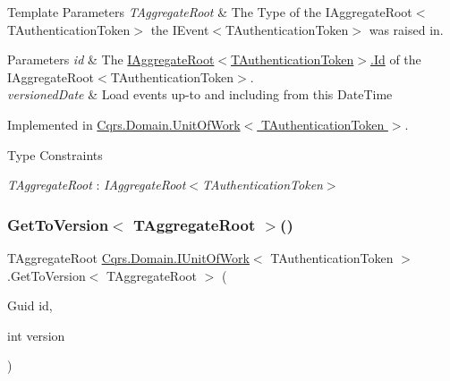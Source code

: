\begin{DoxyTemplParams}{Template Parameters}
{\em T\+Aggregate\+Root} & The Type of the I\+Aggregate\+Root$<$\+T\+Authentication\+Token$>$ the I\+Event$<$\+T\+Authentication\+Token$>$ was raised in.\\
\hline
\end{DoxyTemplParams}

\begin{DoxyParams}{Parameters}
{\em id} & The \hyperlink{interfaceCqrs_1_1Domain_1_1IAggregateRoot_a04aa3198f1371afa345a58e8fcb713d7_a04aa3198f1371afa345a58e8fcb713d7}{I\+Aggregate\+Root$<$\+T\+Authentication\+Token$>$.\+Id} of the I\+Aggregate\+Root$<$\+T\+Authentication\+Token$>$.\\
\hline
{\em versioned\+Date} & Load events up-\/to and including from this Date\+Time\\
\hline
\end{DoxyParams}


Implemented in \hyperlink{classCqrs_1_1Domain_1_1UnitOfWork_ac5f0efae335bee99f820d1c53b3e9f93_ac5f0efae335bee99f820d1c53b3e9f93}{Cqrs.\+Domain.\+Unit\+Of\+Work$<$ T\+Authentication\+Token $>$}.

\begin{Desc}
\item[Type Constraints]\begin{description}
\item[{\em T\+Aggregate\+Root} : {\em I\+Aggregate\+Root$<$T\+Authentication\+Token$>$}]\end{description}
\end{Desc}
\mbox{\label{interfaceCqrs_1_1Domain_1_1IUnitOfWork_a449dde9a112fcce6aaab0e4c8b3b9a71_a449dde9a112fcce6aaab0e4c8b3b9a71}} 
\subsubsection{\texorpdfstring{Get\+To\+Version$<$ T\+Aggregate\+Root $>$()}{GetToVersion< TAggregateRoot >()}}
{\footnotesize\ttfamily T\+Aggregate\+Root \hyperlink{interfaceCqrs_1_1Domain_1_1IUnitOfWork}{Cqrs.\+Domain.\+I\+Unit\+Of\+Work}$<$ T\+Authentication\+Token $>$.Get\+To\+Version$<$ T\+Aggregate\+Root $>$ (\begin{DoxyParamCaption}\item[{Guid}]{id,  }\item[{int}]{version }\end{DoxyParamCaption})}



